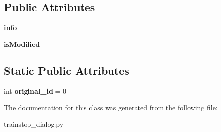 \subsection*{Public Attributes}
\begin{DoxyCompactItemize}
\item 
\hypertarget{class_sim_g_d_c_1_1trainstop__dialog_1_1_trainstop_dialog_a07e00a6e48a129de26805aad8484340d}{}{\bfseries info}\label{class_sim_g_d_c_1_1trainstop__dialog_1_1_trainstop_dialog_a07e00a6e48a129de26805aad8484340d}

\item 
\hypertarget{class_sim_g_d_c_1_1trainstop__dialog_1_1_trainstop_dialog_af28f009f771126aaafeec5509aea4907}{}{\bfseries is\+Modified}\label{class_sim_g_d_c_1_1trainstop__dialog_1_1_trainstop_dialog_af28f009f771126aaafeec5509aea4907}

\end{DoxyCompactItemize}
\subsection*{Static Public Attributes}
\begin{DoxyCompactItemize}
\item 
\hypertarget{class_sim_g_d_c_1_1trainstop__dialog_1_1_trainstop_dialog_ae785f8eabc0358089a1c14a64771b455}{}int {\bfseries original\+\_\+id} = 0\label{class_sim_g_d_c_1_1trainstop__dialog_1_1_trainstop_dialog_ae785f8eabc0358089a1c14a64771b455}

\end{DoxyCompactItemize}


The documentation for this class was generated from the following file\+:\begin{DoxyCompactItemize}
\item 
trainstop\+\_\+dialog.\+py\end{DoxyCompactItemize}
